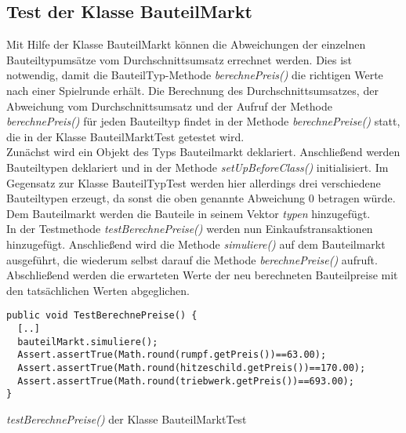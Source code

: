 \subsection{Test der Klasse BauteilMarkt}
\label{sub:junit-spiellogik-bauteilmarkt}  

Mit Hilfe der Klasse BauteilMarkt können die Abweichungen der einzelnen Bauteiltypumsätze vom Durchschnittsumsatz errechnet werden. Dies ist notwendig, damit die BauteilTyp-Methode \textit{berechnePreis()} die richtigen Werte nach einer Spielrunde erhält. Die Berechnung des Durchschnittsumsatzes, der Abweichung vom Durchschnittsumsatz und der Aufruf der Methode \textit{berechnePreis()} für jeden Bauteiltyp findet in der Methode \textit{berechnePreise()} statt, die in der Klasse BauteilMarktTest getestet wird.
\\
Zunächst wird ein Objekt des Typs Bauteilmarkt deklariert. Anschließend werden Bauteiltypen deklariert und in der Methode \textit{setUpBeforeClass()} initialisiert. Im Gegensatz zur Klasse BauteilTypTest werden hier allerdings drei verschiedene Bauteiltypen erzeugt, da sonst die oben genannte Abweichung 0 betragen würde. Dem Bauteilmarkt werden die Bauteile in seinem Vektor \textit{typen} hinzugefügt.
\\
In der Testmethode \textit{testBerechnePreise()} werden nun Einkaufstransaktionen hinzugefügt. Anschließend wird die Methode \textit{simuliere()} auf dem Bauteilmarkt ausgeführt, die wiederum selbst darauf die Methode \textit{berechnePreise()} aufruft. Abschließend werden die erwarteten Werte der neu berechneten Bauteilpreise mit den tatsächlichen Werten abgeglichen.

\begin{programm}[ht]
\begin{lstlisting}[breaklines=true]
public void TestBerechnePreise() {
  [..]
  bauteilMarkt.simuliere();
  Assert.assertTrue(Math.round(rumpf.getPreis())==63.00);
  Assert.assertTrue(Math.round(hitzeschild.getPreis())==170.00);
  Assert.assertTrue(Math.round(triebwerk.getPreis())==693.00);
}
\end{lstlisting}
\caption{\textit{testBerechnePreise()} der Klasse BauteilMarktTest\label{sub:junit-spiellogik-bauteilmarkt}}
\end{programm}
 
